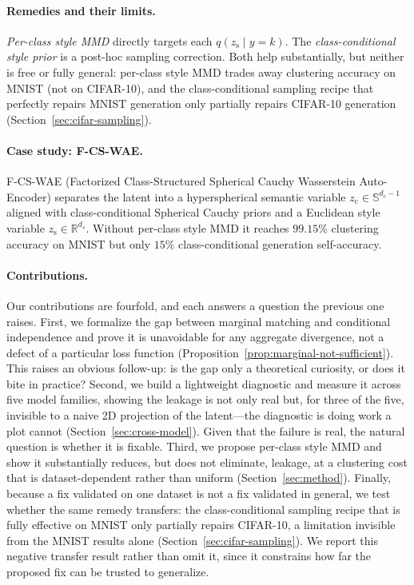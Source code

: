 \documentclass[10pt,letterpaper]{article}
\newcommand{\ours}{F-CS-WAE}
\newcommand{\zc}{z_{\mathrm{c}}}
\newcommand{\zs}{z_{\mathrm{s}}}
\newcommand{\Sph}{\mathbb{S}}
\newcommand{\R}{\mathbb{R}}
\begin{document}
\paragraph{Remedies and their limits.}
\emph{Per-class style MMD} directly targets each $q(\zs\mid y{=}k)$. The
\emph{class-conditional style prior} is a post-hoc sampling correction. Both
help substantially, but neither is free or fully general: per-class style MMD
trades away clustering accuracy on MNIST (not on CIFAR-10), and the
class-conditional sampling recipe that perfectly repairs MNIST generation
only partially repairs CIFAR-10 generation (Section~\ref{sec:cifar-sampling}).

\paragraph{Case study: \ours{}.}
\ours{} (Factorized Class-Structured Spherical Cauchy Wasserstein
Auto-Encoder) separates the latent into a hyperspherical semantic variable
$\zc\in\Sph^{d_c-1}$ aligned with class-conditional Spherical Cauchy priors
and a Euclidean style variable $\zs\in\R^{d_s}$. Without per-class style MMD
it reaches $99.15\%$ clustering accuracy on MNIST but only $15\%$
class-conditional generation self-accuracy.

\paragraph{Contributions.}
Our contributions are fourfold, and each answers a question the previous one
raises. First, we formalize the gap between marginal matching and
conditional independence and prove it is unavoidable for any aggregate
divergence, not a defect of a particular loss function
(Proposition~\ref{prop:marginal-not-sufficient}). This raises an obvious
follow-up: is the gap only a theoretical curiosity, or does it bite in
practice? Second, we build a lightweight diagnostic and measure it across
five model families, showing the leakage is not only real but, for three of
the five, invisible to a naive 2D projection of the latent---the diagnostic
is doing work a plot cannot (Section~\ref{sec:cross-model}). Given that the
failure is real, the natural question is whether it is fixable. Third, we
propose per-class style MMD and show it substantially reduces, but does not
eliminate, leakage, at a clustering cost that is dataset-dependent rather
than uniform (Section~\ref{sec:method}). Finally, because a fix validated on
one dataset is not a fix validated in general, we test whether the same
remedy transfers: the class-conditional sampling recipe that is fully
effective on MNIST only partially repairs CIFAR-10, a limitation invisible
from the MNIST results alone (Section~\ref{sec:cifar-sampling}). We report
this negative transfer result rather than omit it, since it constrains how
far the proposed fix can be trusted to generalize.
\end{document}
